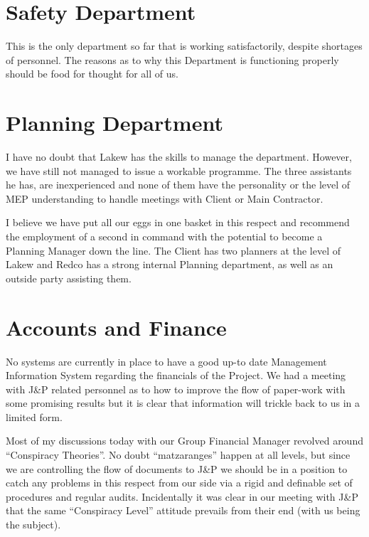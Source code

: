 \section*{Safety Department}

This is the only department so far that is working satisfactorily, despite shortages of personnel. The reasons as to why this Department is functioning properly should be food for thought for all of us. 

\section*{Planning Department}

I have no doubt that Lakew has the skills to manage the department. However, we have still not managed to issue a workable programme. The three assistants he has, are inexperienced and none of them have the personality or the level of MEP understanding to handle meetings with Client or Main Contractor.

I believe we have put all our eggs in one basket in this respect and recommend the employment of a second in command with the potential to become a Planning Manager down the line. The Client has two planners at the level of Lakew and Redco has a strong internal Planning department, as well as an outside party assisting them.



\section*{Accounts and Finance}

No systems are currently in place to have a good up-to date Management Information System regarding the financials of the Project. We had a meeting with J\&P related personnel as to how to improve the flow of paper-work with some promising results but it is clear that information will trickle back to us in a limited form.  

Most of my discussions today with our Group Financial Manager revolved around ``Conspiracy Theories''. No doubt ``matzaranges'' happen at all levels, but since we are controlling the flow of documents to J\&P we should be in a position to catch any problems in this respect from our side via a rigid and definable set of procedures and regular audits.  Incidentally it was clear in our meeting with J\&P that the same ``Conspiracy Level'' attitude prevails from their end (with us being the subject). 

